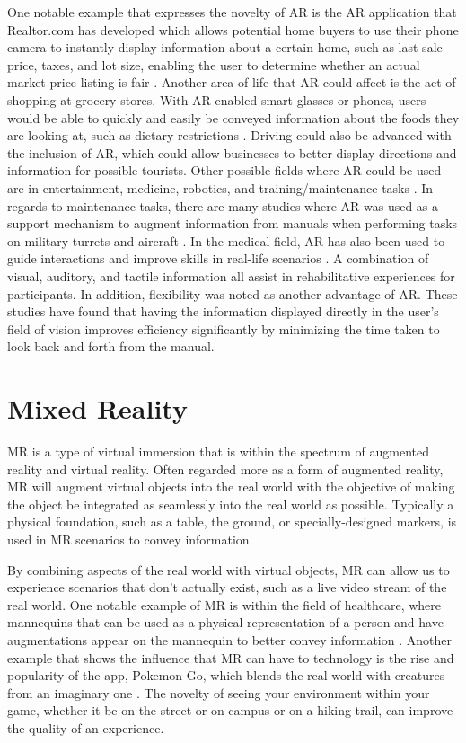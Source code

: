\documentclass[onecolumn, draftclsnofoot,10pt, compsoc]{IEEEtran}
\begin{document}
    One notable example that expresses the novelty of AR is the AR application that Realtor.com has developed which allows potential home buyers to use their phone camera to instantly display information about a certain home, such as last sale price, taxes, and lot size, enabling the user to determine whether an actual market price listing is fair \cite{2}. Another area of life that AR could affect is the act of shopping at grocery stores. With AR-enabled smart glasses or phones, users would be able to quickly and easily be conveyed information about the foods they are looking at, such as dietary restrictions \cite{2}. Driving could also be advanced with the inclusion of AR, which could allow businesses to better display directions and information for possible tourists. Other possible fields where AR could be used are in entertainment, medicine, robotics, and training/maintenance tasks \cite{2}. In regards to maintenance tasks, there are many studies where AR was used as a support mechanism to augment information from manuals when performing tasks on military turrets and aircraft \cite{1}. In the medical field, AR has also been used to guide interactions and improve skills in real-life scenarios \cite{3}. A combination of visual, auditory, and tactile information all assist in rehabilitative experiences for participants. In addition, flexibility was noted as another advantage of AR. These studies have found that having the information displayed directly in the user's field of vision improves efficiency significantly by minimizing the time taken to look back and forth from the manual.

\section{Mixed Reality}
    MR is a type of virtual immersion that is within the spectrum of augmented reality and virtual reality. Often regarded more as a form of augmented reality, MR will augment virtual objects into the real world with the objective of making the object be integrated as seamlessly into the real world as possible. Typically a physical foundation, such as a table, the ground, or specially-designed markers, is used in MR scenarios to convey information. 
    
    By combining aspects of the real world with virtual objects, MR can allow us to experience scenarios that don't actually exist, such as a live video stream of the real world. One notable example of MR is within the field of healthcare, where mannequins that can be used as a physical representation of a person and have augmentations appear on the mannequin to better convey information \cite{2}. Another example that shows the influence that MR can have to technology is the rise and popularity of the app, Pokemon Go, which blends the real world with creatures from an imaginary one \cite{2}. The novelty of seeing your environment within your game, whether it be on the street or on campus or on a hiking trail, can improve the quality of an experience. 
\end{document}
